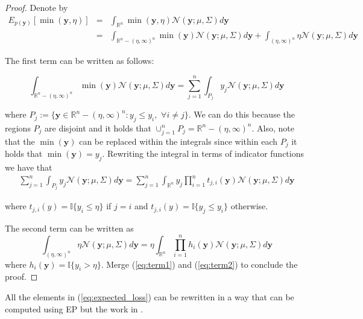 \documentclass{article} %
\newcommand{\by}{\textbf{y}}
\newcommand{\N}{\mathcal{N}}
\newcommand{\IR}{\mathbb{R}}
\newtheorem{proof}{Proof}
\begin{document}
\begin{proof}
Denote by 
\begin{eqnarray}\nonumber
E_{p(\by)} [\min (\by,\eta)] & = & \int_{\IR^n} \min (\by,\eta)  \N(\by; \mu, \Sigma) d\by\\ \nonumber
& = & \int_{\IR^n - (\eta,\infty)^n } \min (\by)  \N(\by; \mu, \Sigma) d\by + \int_{(\eta,\infty)^n} \eta  \N(\by; \mu, \Sigma) d\by  \nonumber
\end{eqnarray}

The first term can be written as follows:

\begin{equation}
 \int_{\IR^n - (\eta,\infty)^n } \min (\by)  \N(\by; \mu, \Sigma) d\by  =    \sum_{j=1}^n \int_{P_j} y_j \N(\by; \mu, \Sigma) d \by \nonumber
\end{equation}\nonumber

where $P_j := \{ \by \in\IR^n - (\eta,\infty)^n  : y_j \leq y_i,\,\, \forall i \neq j \}$. We can do this because the regions $P_j$ are disjoint and it holds that $\cup_{j=1}^{n}P_j = \IR^n - (\eta,\infty)^n $.  Also, note that the $\min(\by)$ can be replaced within the integrals since within each $P_j$ it holds that $\min(\by) = y_j$. Rewriting the integral in terms of indicator functions we have that
\begin{eqnarray}\label{eq:term1}
 \sum_{j=1}^n \int_{P_j} y_j \N(\by; \mu, \Sigma) d \by   =  \sum_{j=1}^n  \int_{\IR^n} y_j \prod_{i=1}^n t_{j,i}(\by) \N(\by; \mu, \Sigma) d \by 
\end{eqnarray}

where $t_{j,i}(y) =\mathbb{I}\{y_i \leq\eta\}$ if $j=i$ and $t_{j,i}(y) =\mathbb{I}\{y_j \leq y_i \}$ otherwise.

The second term can be written as
\begin{equation}\label{eq:term2}
 \int_{(\eta,\infty)^n } \eta  \N(\by; \mu, \Sigma) d\by = \eta\int_{\IR^n} \prod_{i=1}^nh_i(\by) \N(\by; \mu, \Sigma) d\by
\end{equation}
where $h_i(\by) = \mathbb{I}\{y_i>\eta\}$.  Merge (\ref{eq:term1}) and (\ref{eq:term2}) to conclude the proof.
 
\end{proof}

All the elements in (\ref{eq:expected_loss}) can be rewritten in a way that can be computed using EP but the work in \cite{Cunningham*Hennig*Lacoste-Julien_2011}. 
\end{document}
